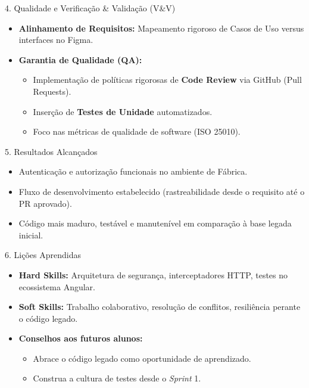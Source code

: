 \documentclass[aspectratio=169]{beamer}
\begin{document}
\begin{frame}{4. Qualidade e Verificação \& Validação (V\&V)}
  \begin{itemize}
    \setlength\itemsep{1em}
    \item \textbf{Alinhamento de Requisitos:} Mapeamento rigoroso de Casos de Uso versus interfaces no Figma.
    \item \textbf{Garantia de Qualidade (QA):}
    \begin{itemize}
        \item Implementação de políticas rigorosas de \textbf{Code Review} via GitHub (Pull Requests).
        \item Inserção de \textbf{Testes de Unidade} automatizados.
        \item Foco nas métricas de qualidade de software (ISO 25010).
    \end{itemize}
  \end{itemize}
\end{frame}

\begin{frame}{5. Resultados Alcançados}
  \begin{itemize}
    \setlength\itemsep{1em}
    \item Autenticação e autorização funcionais no ambiente de Fábrica.
    \item Fluxo de desenvolvimento estabelecido (rastreabilidade desde o requisito até o PR aprovado).
    \item Código mais maduro, testável e manutenível em comparação à base legada inicial.
  \end{itemize}
\end{frame}

\begin{frame}{6. Lições Aprendidas}
  \begin{itemize}
    \setlength\itemsep{1em}
    \item \textbf{Hard Skills:} Arquitetura de segurança, interceptadores HTTP, testes no ecossistema Angular.
    \item \textbf{Soft Skills:} Trabalho colaborativo, resolução de conflitos, resiliência perante o código legado.
    \item \textbf{Conselhos aos futuros alunos:}
    \begin{itemize}
        \item Abrace o código legado como oportunidade de aprendizado.
        \item Construa a cultura de testes desde o \textit{Sprint} 1.
    \end{itemize}
  \end{itemize}
\end{frame}
\end{document}
